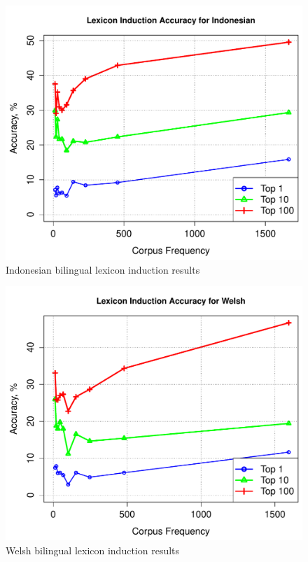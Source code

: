 \documentclass[11pt]{article}
\begin{document}
\begin{figure}
\begin{center}
\includegraphics[width=0.9 \linewidth]{../byFreqGraphs/id/lexinductnew.pdf}
\vskip -0.15in
\caption{Indonesian bilingual lexicon induction results}
\label{fig:bli.id} 
\end{center}
\end{figure}



\begin{figure}
\begin{center}
\includegraphics[width=0.9 \linewidth]{../byFreqGraphs/cy/lexinductnew.pdf}
\vskip -0.15in
\caption{Welsh bilingual lexicon induction results}
\label{fig:bli.cy} 
\end{center}
\end{figure}
\end{document}
